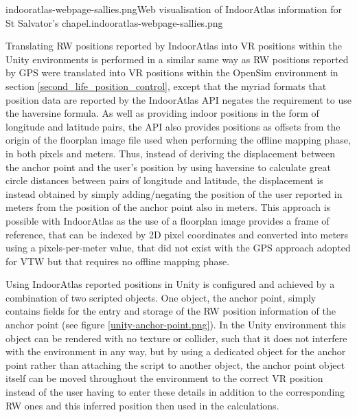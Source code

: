         {indooratlas-webpage-sallies.png}{Web visualisation of IndoorAtlas information for St Salvator's chapel.}{indooratlas-webpage-sallies.png}

Translating RW positions reported by IndoorAtlas into VR positions within the Unity environments is performed in a similar same way as RW positions reported by GPS were translated into VR positions within the OpenSim environment in section \ref{second_life_position_control}, except that the myriad formats that position data are reported by the IndoorAtlas API negates the requirement to use the haversine formula. As well as providing indoor positions in the form of longitude and latitude pairs, the API also provides positions as offsets from the origin of the floorplan image file used when performing the offline mapping phase, in both pixels and meters. Thus, instead of deriving the displacement between the anchor point and the user's position by using haversine to calculate great circle distances between pairs of longitude and latitude, the displacement is instead obtained by simply adding/negating the position of the user reported in meters from the position of the anchor point also in meters. This approach is possible with IndoorAtlas as the use of a floorplan image provides a frame of reference, that can be indexed by 2D pixel coordinates and converted into meters using a pixels-per-meter value, that did not exist with the GPS approach adopted for VTW but that requires no offline mapping phase.

	
Using IndoorAtlas reported positions in Unity is configured and achieved by a combination of two scripted objects. One object, the anchor point, simply contains fields for the entry and storage of the RW position information of the anchor point (see figure \ref{unity-anchor-point.png}). In the Unity environment this object can be rendered with no texture or collider, such that it does not interfere with the environment in any way, but by using a dedicated object for the anchor point rather than attaching the script to another object, the anchor point object itself can be moved throughout the environment to the correct VR position instead of the user having to enter these details in addition to the corresponding RW ones and this inferred position then used in the calculations.

